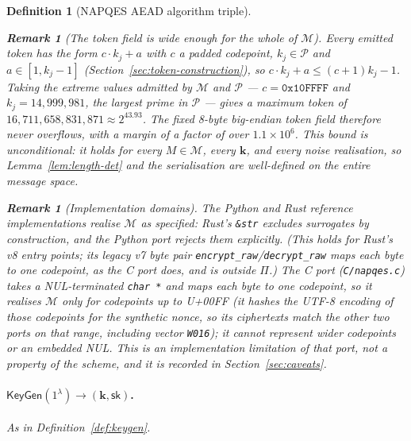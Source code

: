 \documentclass[11pt,a4paper]{article}
\newtheorem{definition}[theorem]{Definition}
\newtheorem{remark}[theorem]{Remark}
\begin{document}
\begin{definition}[NAPQES AEAD algorithm triple]
\begin{remark}[The token field is wide enough for the whole of $\mathcal{M}$]
\label{rem:token-fit}
Every emitted token has the form $c\cdot k_j+a$ with $c$ a padded codepoint,
$k_j\in\mathcal{P}$ and $a\in[1,k_j-1]$
(Section~\ref{sec:token-construction}), so
$c\cdot k_j+a\le(c+1)k_j-1$. Taking the extreme values admitted by
$\mathcal{M}$ and $\mathcal{P}$ — $c=\mathtt{0x10FFFF}$ and
$k_j=14{,}999{,}981$, the largest prime in $\mathcal{P}$ — gives a maximum
token of $16{,}711{,}658{,}831{,}871\approx2^{43.93}$. The fixed 8-byte
big-endian token field therefore never overflows, with a margin of a factor
of over $1.1\times10^6$. This bound is unconditional: it holds for every
$M\in\mathcal{M}$, every $\mathbf{k}$, and every noise realisation, so
Lemma~\ref{lem:length-det} and the serialisation are well-defined on the
entire message space.
\end{remark}

\begin{remark}[Implementation domains]\label{rem:impl-domain}
The Python and Rust reference implementations realise $\mathcal{M}$ as
specified: Rust's \texttt{\&str} excludes surrogates by construction, and
the Python port rejects them explicitly. (This holds for Rust's v8 entry
points; its legacy v7 byte pair \texttt{encrypt\_raw}/\texttt{decrypt\_raw}
maps each byte to one codepoint, as the C port does, and is outside
$\Pi$.) The C port
(\texttt{C/napqes.c}) takes a NUL-terminated \texttt{char\,*} and maps each
\emph{byte} to one codepoint, so it realises $\mathcal{M}$ only for
codepoints up to U+00FF (it hashes the UTF-8 encoding of those codepoints
for the synthetic nonce, so its ciphertexts match the other two ports on
that range, including vector \texttt{W016}); it cannot represent wider
codepoints or an embedded NUL. This is an
implementation limitation of that port, not a property of the scheme, and
it is recorded in Section~\ref{sec:caveats}.
\end{remark}

\paragraph{$\mathsf{KeyGen}(1^{\lambda}) \to (\mathbf{k},\mathsf{sk})$.}
As in Definition~\ref{def:keygen}.


\end{definition}
\end{document}
